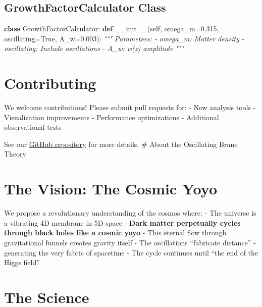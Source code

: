 \documentclass[
  11pt,
]{report}
\newenvironment{Shaded}{}{}
\newcommand{\CommentTok}[1]{\textcolor[rgb]{0.38,0.63,0.69}{\textit{#1}}}
\newcommand{\FloatTok}[1]{\textcolor[rgb]{0.25,0.63,0.44}{#1}}
\newcommand{\FunctionTok}[1]{\textcolor[rgb]{0.02,0.16,0.49}{#1}}
\newcommand{\KeywordTok}[1]{\textcolor[rgb]{0.00,0.44,0.13}{\textbf{#1}}}
\newcommand{\NormalTok}[1]{#1}
\newcommand{\OperatorTok}[1]{\textcolor[rgb]{0.40,0.40,0.40}{#1}}
\newcommand{\VariableTok}[1]{\textcolor[rgb]{0.10,0.09,0.49}{#1}}
\begin{document}
\subsection{GrowthFactorCalculator
Class}\label{growthfactorcalculator-class}

\begin{Shaded}
\begin{Highlighting}[]
\KeywordTok{class}\NormalTok{ GrowthFactorCalculator:}
    \KeywordTok{def} \FunctionTok{\_\_init\_\_}\NormalTok{(}\VariableTok{self}\NormalTok{, omega\_m}\OperatorTok{=}\FloatTok{0.315}\NormalTok{, oscillating}\OperatorTok{=}\VariableTok{True}\NormalTok{, A\_w}\OperatorTok{=}\FloatTok{0.003}\NormalTok{):}
        \CommentTok{"""}
\CommentTok{        Parameters:}
\CommentTok{        {-} omega\_m: Matter density}
\CommentTok{        {-} oscillating: Include oscillations}
\CommentTok{        {-} A\_w: w(z) amplitude}
\CommentTok{        """}
\end{Highlighting}
\end{Shaded}

\section{Contributing}\label{contributing}

We welcome contributions! Please submit pull requests for: - New
analysis tools - Visualization improvements - Performance optimizations
- Additional observational tests

See our
\href{https://github.com/\%7B\%7B\%20site.github_username\%20\%7D\%7D/oscillating-brane-DM}{GitHub
repository} for more details. \newpage \# About the Oscillating Brane
Theory

\section{The Vision: The Cosmic Yoyo}\label{the-vision-the-cosmic-yoyo}

We propose a revolutionary understanding of the cosmos where: - The
universe is a vibrating 4D membrane in 5D space - \textbf{Dark matter
perpetually cycles through black holes like a cosmic yoyo} - This
eternal flow through gravitational funnels creates gravity itself - The
oscillations ``fabricate distance'' - generating the very fabric of
spacetime - The cycle continues until ``the end of the Higgs field''

\section{The Science}\label{the-science}
\end{document}
